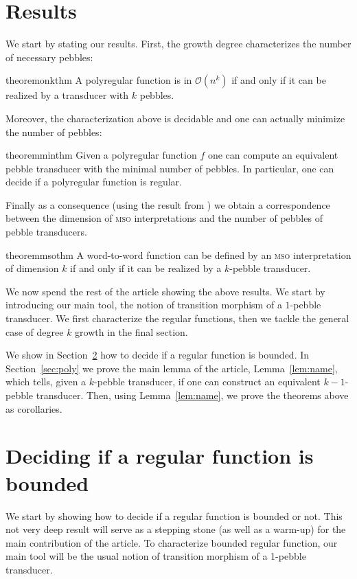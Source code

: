 \documentclass[sigplan,review,anonymous]{acmart}\settopmatter{printfolios=true,printccs=false,printacmref=false}
\newcommand{\Oo}{\mathcal O}
\newcommand{\mso}{\textsc{mso}\xspace}
\theoremstyle{definition}
\theoremstyle{remark}
\begin{document}
\section{Results}
\label{sec:results}
We start by stating our results. First, the growth degree characterizes the number of necessary pebbles:
\begin{restatable}[Characterization]{theorem}{onkthm}
    \label{thm:onk}
    A polyregular function is in $\Oo(n^k)$ if and only if it can be realized by a transducer with $k$ pebbles.
\end{restatable}
Moreover, the characterization above is decidable and one can actually minimize the number of pebbles:
\begin{restatable}[Minimization]{theorem}{minthm}
    \label{thm:min}
    Given a polyregular function $f$ one can compute an equivalent pebble transducer with the minimal number of pebbles. In particular, one can decide if a polyregular function is regular.
\end{restatable}
Finally as a consequence (using the result from \cite[Theorem~7]{BojanczykKL19}) we obtain a correspondence between the dimension of \mso interpretations and the number of pebbles of pebble transducers.
\begin{restatable}[\mso-dimension]{theorem}{msothm}
    \label{thm:mso}
    A word-to-word function can be defined by an \mso interpretation of dimension $k$ if and only if it can be realized by a $k$-pebble transducer.
\end{restatable}
We now spend the rest of the article showing the above results. We start by introducing our main tool, the notion of transition morphism of a $1$-pebble transducer. We first characterize the regular functions, then we tackle the general case of degree $k$ growth in the final section.

We show in Section~\ref{sec:reg} how to decide if a regular function is bounded.  In Section~\ref{sec:poly} we prove the main lemma of the article, Lemma~\ref{lem:name}, which tells, given a $k$-pebble transducer, if one can construct an equivalent $k-1$-pebble transducer. Then, using Lemma~\ref{lem:name}, we prove the theorems above as corollaries.


\section{Deciding if a regular function is bounded}
\label{sec:reg}
We start by showing how to decide if a regular function is bounded or not. This not very deep result will serve as a stepping stone (as well as a warm-up) for the main contribution of the article.
To characterize bounded regular function, our main tool will be the usual notion of transition morphism of a 1-pebble transducer.
\end{document}
